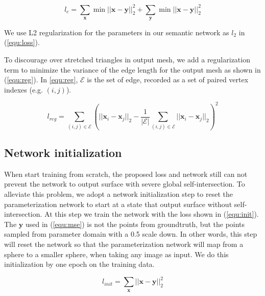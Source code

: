 \begin{equation}
\label{equ:chmf}
l_c = \sum_\mathbf{x} \min||\mathbf{x}-\mathbf{y}||_2^2+\sum_\mathbf{y} \min||\mathbf{x}-\mathbf{y}||_2^2
\end{equation}

 We use L2 regularization for the parameters in our semantic network as $l_2$ in (\ref{equ:loss}).

 To discourage over stretched triangles in output mesh, we add a regularization term to minimize the variance of the edge length for the output mesh as shown in (\ref{equ:reg}). In \ref{equ:reg}, $\mathcal{E}$ is the set of edge, recorded as a set of paired vertex indexes (e.g. $(i,j)$).

\begin{equation}
\label{equ:reg}
l_{reg} = \sum_{(i,j)\in\mathcal{E}}(||\mathbf{x}_i-\mathbf{x}_j||_2 - \frac{1}{|\mathcal{E}|}\sum_{(i,j)\in\mathcal{E} }||\mathbf{x}_i-\mathbf{x}_j||_2)^2
\end{equation}

\subsection{Network initialization}
When start training from scratch, the proposed loss and network still can not prevent the network to output surface with severe global self-intersection. To alleviate this problem, we adopt a network initialization step to reset the parameterization network to start at a state that output surface without self-intersection. At this step we train the network with the loss shown in (\ref{equ:init}). The $\mathbf{y}$ used in (\ref{equ:mse}) is not the points from groundtruth, but the points sampled from parameter domain with a 0.5 scale down. In other words, this step will reset the network so that the parameterization network will map from a sphere to a smaller sphere, when taking any image as input. We do this initialization by one epoch on the training data. 

\begin{equation}
\label{equ:init}
l_{init} = \sum_\mathbf{x}||\mathbf{x} - \mathbf{y}||_2^2
\end{equation}


